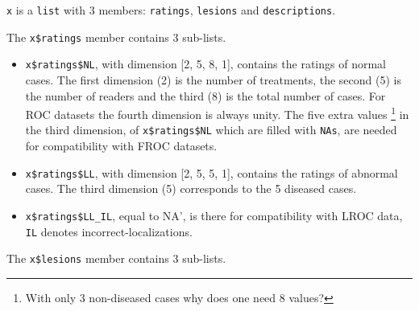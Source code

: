 \documentclass[
]{book}
\newenvironment{Shaded}{\begin{snugshade}}{\end{snugshade}}
\newcommand{\AttributeTok}[1]{\textcolor[rgb]{0.77,0.63,0.00}{#1}}
\newcommand{\CommentTok}[1]{\textcolor[rgb]{0.56,0.35,0.01}{\textit{#1}}}
\newcommand{\DecValTok}[1]{\textcolor[rgb]{0.00,0.00,0.81}{#1}}
\newcommand{\FunctionTok}[1]{\textcolor[rgb]{0.00,0.00,0.00}{#1}}
\newcommand{\NormalTok}[1]{#1}
\newcommand{\SpecialCharTok}[1]{\textcolor[rgb]{0.00,0.00,0.00}{#1}}
\begin{document}
\texttt{x} is a \texttt{list} with 3 members: \texttt{ratings}, \texttt{lesions} and \texttt{descriptions}.

\begin{Shaded}
\end{Shaded}

The \texttt{x\$ratings} member contains 3 sub-lists.

\begin{Shaded}
\end{Shaded}

\begin{itemize}
\item
  \texttt{x\$ratings\$NL}, with dimension {[}2, 5, 8, 1{]}, contains the ratings of normal cases. The first dimension (2) is the number of treatments, the second (5) is the number of readers and the third (8) is the total number of cases. For ROC datasets the fourth dimension is always unity. The five extra values \footnote{With only 3 non-diseased cases why does one need 8 values?} in the third dimension, of \texttt{x\$ratings\$NL} which are filled with \texttt{NAs}, are needed for compatibility with FROC datasets.
\item
  \texttt{x\$ratings\$LL}, with dimension {[}2, 5, 5, 1{]}, contains the ratings of abnormal cases. The third dimension (5) corresponds to the 5 diseased cases.
\item
  \texttt{x\$ratings\$LL\_IL}, equal to NA', is there for compatibility with LROC data, \texttt{IL} denotes incorrect-localizations.
\end{itemize}

The \texttt{x\$lesions} member contains 3 sub-lists.
\end{document}
